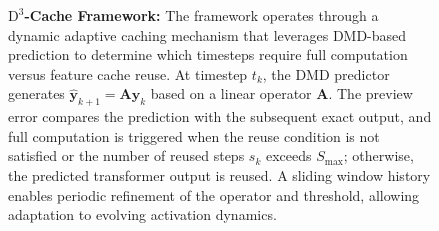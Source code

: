 \begin{figure}[!t]
    \centering
    \caption{%
    \textbf{$\mathrm{D}^3$-Cache Framework:}
    The framework operates through a dynamic adaptive caching mechanism
that leverages DMD-based prediction to determine
which timesteps require full computation
versus feature cache reuse.
At timestep $t_k$, the DMD predictor generates $\hat{\mathbf{y}}_{k+1} = \mathbf{A} \mathbf{y}_k$
based on a linear operator $\mathbf{A}$.
The preview error compares the prediction with the subsequent exact output,
and full computation is triggered when the reuse condition is not satisfied
or the number of reused steps $s_k$ exceeds $S_{\max}$;
otherwise, the predicted transformer output is reused.
A sliding window history enables periodic refinement of the operator and threshold,
allowing adaptation to evolving activation dynamics.
    }
    \label{fig:architecture}
    \vspace{-10pt}
\end{figure}
